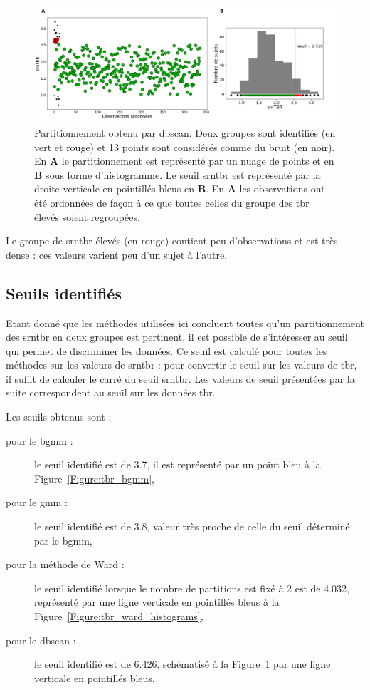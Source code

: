 \begin{figure}[h!]
  \centering
	\includegraphics[width=1.0\linewidth]{figures/chapter-4/tbr-dbscan-clustering-plot} 
  \caption[Partitionnement obtenu par \gls{dbscan}.]{Partitionnement obtenu par \gls{dbscan}. Deux groupes sont identifiés (en vert et rouge) et 13 points sont considérés comme du bruit (en noir).
	En \textbf{A} le partitionnement est représenté par un nuage de points et en \textbf{B} sous forme d'histogramme. Le seuil \gls{srntbr} est représenté par 
	la droite verticale en pointillés bleus en \textbf{B}. En \textbf{A} les observations ont été ordonnées de façon à ce que toutes celles du groupe des \gls{tbr} élevés 
	soient regroupées.}
  \label{Figure:tbr_dbscan_clustering_plot}
\end{figure}

Le groupe de \gls{srntbr} élevés (en rouge) contient peu d'observations et est très dense : ces valeurs varient peu d'un sujet à l'autre.


\subsection{Seuils identifiés}
Etant donné que les méthodes utilisées ici concluent toutes qu'un partitionnement des \gls{srntbr} en deux groupes est pertinent, il est possible de s'intéresser
au seuil qui permet de discriminer les données. Ce seuil est calculé pour toutes les méthodes sur les valeurs de \gls{srntbr} : pour convertir le seuil sur 
les valeurs de \gls {tbr}, il suffit de calculer le carré du seuil \gls{srntbr}. Les valeurs de seuil présentées par la suite correspondent au seuil
sur les données \gls{tbr}.

Les seuils obtenus sont : 
\begin{description}
\item[pour le \gls{bgmm} : ] le seuil identifié est de 3.7, il est représenté par un point bleu à la Figure~\ref{Figure:tbr_bgmm},
\item[pour le \gls{gmm} : ] le seuil identifié est de 3.8, valeur très proche de celle du seuil déterminé par le \gls{bgmm},
\item[pour la méthode de Ward : ] le seuil identifié lorsque le nombre de partitions est fixé à 2 est de 4.032, représenté
par une ligne verticale en pointillés bleus à la Figure~\ref{Figure:tbr_ward_histograms},
\item[pour le \gls{dbscan} : ] le seuil identifié est de 6.426, schématisé à la Figure~\ref{Figure:tbr_dbscan_clustering_plot} par une ligne
verticale en pointillés bleus. 
\end{description}

